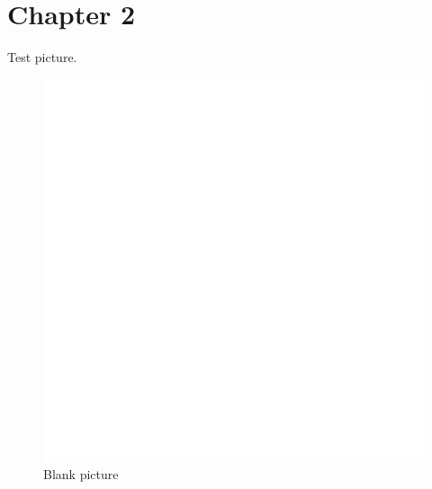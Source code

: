 \section {Chapter 2}

Test picture.

\begin{figure}[!h]
  \centering
  \includegraphics[width=12cm]{chapter_2/figures/blank.png}
  \caption{Blank picture}
  \label{fig:Blank-picture}
\end{figure}
